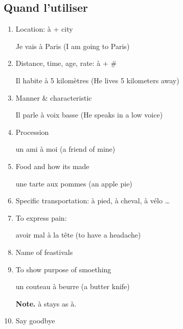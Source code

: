 \documentclass{book}
\begin{document}
        \subsection{Quand l'utiliser}
            \begin{enumerate}
                \item Location: à + city
                    \begin{center}
                        Je vais à Paris (I am going to Paris)
                    \end{center}
                \item Distance, time, age, rate: à + \#
                    \begin{center}
                        Il habite à 5 kilomètres (He lives 5 kilometers away)
                    \end{center}
                \item Manner \& characteristic
                    \begin{center}
                        Il parle à voix basse (He speaks in a low voice)
                    \end{center}
                \item Procession
                    \begin{center}
                        un ami à moi (a friend of mine)
                    \end{center}
                \item Food and how its made
                    \begin{center}
                        une tarte aux pommes (an apple pie)
                    \end{center}
                \item Specific transportation: à pied, à cheval, à vélo \dots
                \item To express pain:
                    \begin{center}
                        avoir mal à la tête (to have a headache)
                    \end{center}
                \item Name of feastivals
                \item To show purpose of smoething
                    \begin{center}
                        un couteau à beurre (a butter knife)
                    \end{center}
                    \textbf{Note.} à stays as à.
                \item Say goodbye

\end{enumerate}
\end{document}
